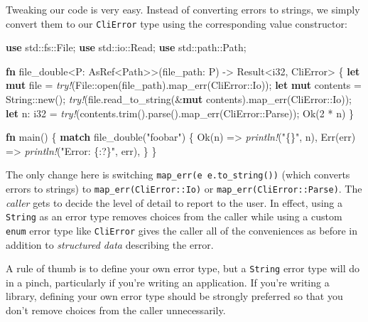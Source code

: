 \documentclass[a4paper,]{book}
\newenvironment{Shaded}{\begin{snugshade}}{\end{snugshade}}
\newcommand{\KeywordTok}[1]{\textcolor[rgb]{0.13,0.29,0.53}{\textbf{{#1}}}}
\newcommand{\DataTypeTok}[1]{\textcolor[rgb]{0.13,0.29,0.53}{{#1}}}
\newcommand{\DecValTok}[1]{\textcolor[rgb]{0.00,0.00,0.81}{{#1}}}
\newcommand{\ConstantTok}[1]{\textcolor[rgb]{0.00,0.00,0.00}{{#1}}}
\newcommand{\StringTok}[1]{\textcolor[rgb]{0.31,0.60,0.02}{{#1}}}
\newcommand{\PreprocessorTok}[1]{\textcolor[rgb]{0.56,0.35,0.01}{\textit{{#1}}}}
\newcommand{\NormalTok}[1]{{#1}}
\begin{document}
Tweaking our code is very easy. Instead of converting errors to strings,
we simply convert them to our \texttt{CliError} type using the
corresponding value constructor:

\begin{Shaded}
\begin{Highlighting}[]
\KeywordTok{use} \NormalTok{std::fs::File;}
\KeywordTok{use} \NormalTok{std::io::Read;}
\KeywordTok{use} \NormalTok{std::path::Path;}

\KeywordTok{fn} \NormalTok{file_double<P: AsRef<Path>>(file_path: P) -> }\DataTypeTok{Result}\NormalTok{<}\DataTypeTok{i32}\NormalTok{, CliError> \{}
    \KeywordTok{let} \KeywordTok{mut} \NormalTok{file = }\PreprocessorTok{try!}\NormalTok{(File::open(file_path).map_err(CliError::Io));}
    \KeywordTok{let} \KeywordTok{mut} \NormalTok{contents = }\DataTypeTok{String}\NormalTok{::new();}
    \PreprocessorTok{try!}\NormalTok{(file.read_to_string(&}\KeywordTok{mut} \NormalTok{contents).map_err(CliError::Io));}
    \KeywordTok{let} \NormalTok{n: }\DataTypeTok{i32} \NormalTok{= }\PreprocessorTok{try!}\NormalTok{(contents.trim().parse().map_err(CliError::Parse));}
    \ConstantTok{Ok}\NormalTok{(}\DecValTok{2} \NormalTok{* n)}
\NormalTok{\}}

\KeywordTok{fn} \NormalTok{main() \{}
    \KeywordTok{match} \NormalTok{file_double(}\StringTok{"foobar"}\NormalTok{) \{}
        \ConstantTok{Ok}\NormalTok{(n) => }\PreprocessorTok{println!}\NormalTok{(}\StringTok{"\{\}"}\NormalTok{, n),}
        \ConstantTok{Err}\NormalTok{(err) => }\PreprocessorTok{println!}\NormalTok{(}\StringTok{"Error: \{:?\}"}\NormalTok{, err),}
    \NormalTok{\}}
\NormalTok{\}}
\end{Highlighting}
\end{Shaded}

The only change here is switching
\texttt{map\_err(\textbar{}e\textbar{}\ e.to\_string())} (which converts
errors to strings) to \texttt{map\_err(CliError::Io)} or
\texttt{map\_err(CliError::Parse)}. The \emph{caller} gets to decide the
level of detail to report to the user. In effect, using a
\texttt{String} as an error type removes choices from the caller while
using a custom \texttt{enum} error type like \texttt{CliError} gives the
caller all of the conveniences as before in addition to \emph{structured
data} describing the error.

A rule of thumb is to define your own error type, but a \texttt{String}
error type will do in a pinch, particularly if you're writing an
application. If you're writing a library, defining your own error type
should be strongly preferred so that you don't remove choices from the
caller unnecessarily.
\end{document}
